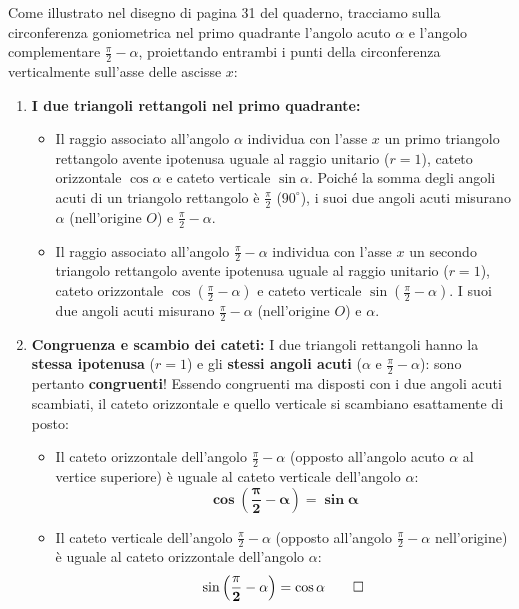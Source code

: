 \documentclass[11pt,a4paper,oneside]{report}
\begin{document}
\begin{dimostrazione}
Come illustrato nel disegno di pagina 31 del quaderno, tracciamo sulla circonferenza goniometrica nel primo quadrante l'angolo acuto $\alpha$ e l'angolo complementare $\frac{\pi}{2} - \alpha$, proiettando entrambi i punti della circonferenza verticalmente sull'asse delle ascisse $x$:
\begin{enumerate}
    \item \textbf{I due triangoli rettangoli nel primo quadrante:}
    \begin{itemize}
        \item Il raggio associato all'angolo $\alpha$ individua con l'asse $x$ un primo triangolo rettangolo avente ipotenusa uguale al raggio unitario ($r = 1$), cateto orizzontale $\cos\alpha$ e cateto verticale $\sin\alpha$. Poiché la somma degli angoli acuti di un triangolo rettangolo è $\frac{\pi}{2}$ ($90^\circ$), i suoi due angoli acuti misurano $\alpha$ (nell'origine $O$) e $\frac{\pi}{2} - \alpha$.
        \item Il raggio associato all'angolo $\frac{\pi}{2} - \alpha$ individua con l'asse $x$ un secondo triangolo rettangolo avente ipotenusa uguale al raggio unitario ($r = 1$), cateto orizzontale $\cos\left(\frac{\pi}{2} - \alpha\right)$ e cateto verticale $\sin\left(\frac{\pi}{2} - \alpha\right)$. I suoi due angoli acuti misurano $\frac{\pi}{2} - \alpha$ (nell'origine $O$) e $\alpha$.
    \end{itemize}
    \item \textbf{Congruenza e scambio dei cateti:}
    I due triangoli rettangoli hanno la \textbf{stessa ipotenusa} ($r = 1$) e gli \textbf{stessi angoli acuti} ($\alpha$ e $\frac{\pi}{2} - \alpha$): sono pertanto \textbf{congruenti}!
    Essendo congruenti ma disposti con i due angoli acuti scambiati, il cateto orizzontale e quello verticale si scambiano esattamente di posto:
    \begin{itemize}
        \item Il cateto orizzontale dell'angolo $\frac{\pi}{2} - \alpha$ (opposto all'angolo acuto $\alpha$ al vertice superiore) è uguale al cateto verticale dell'angolo $\alpha$:
        \begin{equation}
            \mathbf{\cos\left(\frac{\pi}{2} - \alpha\right) = \sin\alpha}
        \end{equation}
        \item Il cateto verticale dell'angolo $\frac{\pi}{2} - \alpha$ (opposto all'angolo $\frac{\pi}{2} - \alpha$ nell'origine) è uguale al cateto orizzontale dell'angolo $\alpha$:
        \begin{equation}
            \mathbf{\sin\left(\frac{\pi}{2} - \alpha\right) = \cos\alpha} \qedhere
        \end{equation}
    \end{itemize}
\end{enumerate}
\end{dimostrazione}
\end{document}
